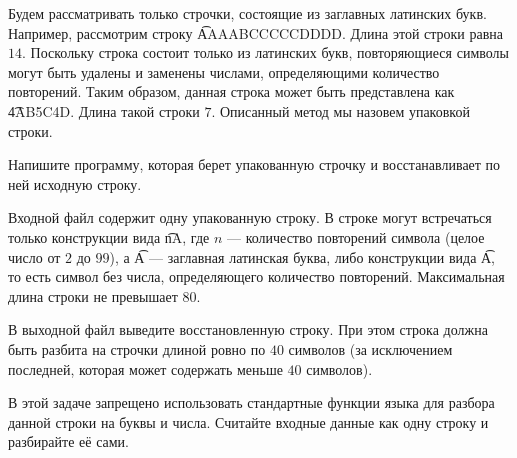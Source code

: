 Будем рассматривать только строчки, состоящие из заглавных латинских букв.
Например, рассмотрим строку \t{AAAABCCCCCDDDD}. Длина этой строки равна $14$.
Поскольку строка состоит только из латинских букв, повторяющиеся символы могут
быть удалены и заменены числами, определяющими количество повторений. Таким
образом, данная строка может быть представлена как \t{4AB5C4D}. Длина такой
строки $7$. Описанный метод мы назовем упаковкой строки. 

Напишите программу, которая берет упакованную строчку и восстанавливает по ней
исходную строку. 


\InputFile

Входной файл содержит одну упакованную строку. В строке могут встречаться
только конструкции вида \t{nA}, где $n$ --- количество повторений символа
(целое число от $2$ до $99$), а \t{A} --- заглавная латинская буква, либо
конструкции вида \t{A}, то есть символ без числа, определяющего количество
повторений. Максимальная длина строки не превышает $80$.

\OutputFile

В выходной файл выведите восстановленную строку. При этом строка должна быть
разбита на строчки длиной ровно по $40$ символов (за исключением последней,
которая может содержать меньше $40$ символов). 

\SAMPLES

\Note

В этой задаче запрещено использовать стандартные функции
языка для разбора данной строки на буквы и числа.
Считайте входные данные как одну строку и разбирайте её сами.
